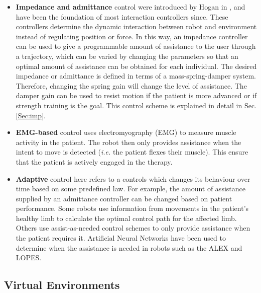 \documentclass[12pt]{report}
\begin{document}
\begin{itemize}

	\item \textbf{Impedance and admittance} control were introduced by Hogan in \cite{Hogan1985}, and have been the foundation of most interaction controllers since. These controllers determine the dynamic interaction between robot and environment instead of regulating position or force. In this way, an impedance controller can be used to give a programmable amount of assistance to the user through a trajectory, which can be varied by changing the parameters so that an optimal amount of assistance can be obtained for each individual. The desired impedance or admittance is defined in terms of a mass-spring-damper system. Therefore, changing the spring gain will change the level of assistance. The damper gain can be used to resist motion if the patient is more advanced or if strength training is the goal. This control scheme is explained in detail in Sec. \ref{Sec:imp}.
	
	\item \textbf{EMG-based} control uses electromyography (EMG) to measure muscle activity in the patient. The robot then only provides assistance when the intent to move is detected (\textit{i.e.} the patient flexes their muscle). This ensure that the patient is actively engaged in the therapy. 
	
	\item \textbf{Adaptive} control here refers to a controls which changes its behaviour over time based on some predefined law. For example, the amount of assistance supplied by an admittance controller can be changed based on patient performance. Some robots use information from movements in the patient's healthy limb to calculate the optimal control path for the affected limb. Others use assist-as-needed control schemes to only provide assistance when the patient requires it. Artificial Neural Networks have been used to determine when the assistance is needed in robots such as the ALEX and LOPES.
	
\end{itemize}
		
	\subsection{Virtual Environments} \label{Sec:VR}
	
\end{document}
